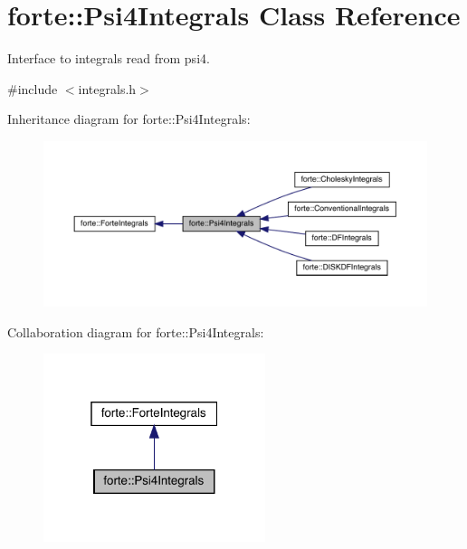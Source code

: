 \hypertarget{classforte_1_1_psi4_integrals}{}\section{forte\+:\+:Psi4\+Integrals Class Reference}
\label{classforte_1_1_psi4_integrals}


Interface to integrals read from psi4.  




{\ttfamily \#include $<$integrals.\+h$>$}



Inheritance diagram for forte\+:\+:Psi4\+Integrals\+:
\nopagebreak
\begin{figure}[H]
\begin{center}
\leavevmode
\includegraphics[width=350pt]{classforte_1_1_psi4_integrals__inherit__graph}
\end{center}
\end{figure}


Collaboration diagram for forte\+:\+:Psi4\+Integrals\+:
\nopagebreak
\begin{figure}[H]
\begin{center}
\leavevmode
\includegraphics[width=184pt]{classforte_1_1_psi4_integrals__coll__graph}
\end{center}
\end{figure}
